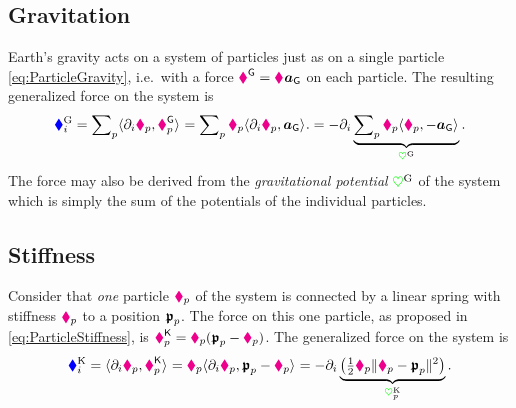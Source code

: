 \subsection{Gravitation}\label{sec:ParticleSysGravitation}
Earth's gravity acts on a system of particles just as on a single particle \eqref{eq:ParticleGravity}, i.e.\ with a force $\boldsymbol{\textcolor{magenta}{\blacklozenge}}_{}^{\mathsf{G}} = \textcolor{magenta}{\blacklozenge}_{} \boldsymbol{a}_{\mathsf{G}}$ on each particle.
The resulting generalized force on the system is
\begin{align}
 \textcolor{blue}{\blacklozenge}^{\mathrm{G}}_{i}
 = \sum\nolimits_{p} \langle \partial_{i} \boldsymbol{\textcolor{magenta}{\blacklozenge}}_{p}, \boldsymbol{\textcolor{magenta}{\blacklozenge}}_{p}^{\mathsf{G}} \rangle_{}
 = \sum\nolimits_{p} \textcolor{magenta}{\blacklozenge}_{p} \langle \partial_{i}\boldsymbol{\textcolor{magenta}{\blacklozenge}}_{p}, \boldsymbol{a}_{\mathsf{G}} \rangle_{}.
 = -\partial_{i} \underbrace{\sum\nolimits_{p} \textcolor{magenta}{\blacklozenge}_{p} \langle \boldsymbol{\textcolor{magenta}{\blacklozenge}}_{p}, -\boldsymbol{a}_{\mathsf{G}} \rangle_{}}_{\textcolor{green}{\heartsuit}^{\mathrm{G}}}.
\label{eq:ParticleSysGravity}
\end{align}
The force may also be derived from the \textit{gravitational potential} $\textcolor{green}{\heartsuit}^{\mathrm{G}}$ of the system which is simply the sum of the potentials of the individual particles.


\subsection{Stiffness}\label{sec:ParticleSysStiffness}
Consider that \textit{one} particle $\boldsymbol{\textcolor{magenta}{\blacklozenge}}_{p}$ of the system is connected by a linear spring with stiffness $\textcolor{magenta}{\blacklozenge}_{p}$ to a position $\boldsymbol{\mathfrak{p}}_{p}$.
The force on this one particle, as proposed in \eqref{eq:ParticleStiffness}, is $\boldsymbol{\textcolor{magenta}{\blacklozenge}}_{p}^{\mathsf{K}} = \textcolor{magenta}{\blacklozenge}_{p} (\boldsymbol{\mathfrak{p}}_{p} - \boldsymbol{\textcolor{magenta}{\blacklozenge}}_{p})$.
The generalized force on the system is
\begin{align}
 \textcolor{blue}{\blacklozenge}^{\mathrm{K}}_{i} 
 = \langle \partial_{i} \boldsymbol{\textcolor{magenta}{\blacklozenge}}_{p}, \boldsymbol{\textcolor{magenta}{\blacklozenge}}_{p}^{\mathsf{K}} \rangle_{} 
 = \textcolor{magenta}{\blacklozenge}_{p} \langle \partial_{i} \boldsymbol{\textcolor{magenta}{\blacklozenge}}_{p}, \boldsymbol{\mathfrak{p}}_{p} - \boldsymbol{\textcolor{magenta}{\blacklozenge}}_{p} \rangle_{}
 = -\partial_{i} \underbrace{\big( \tfrac{1}{2} \textcolor{magenta}{\blacklozenge}_{p} \| \boldsymbol{\textcolor{magenta}{\blacklozenge}}_{p} - \boldsymbol{\mathfrak{p}}_{p} \|_{}^2 \big)}_{\textcolor{green}{\heartsuit}^{\mathrm{K}}_{p}}.
\end{align}

